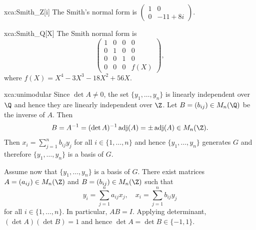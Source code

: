  \begin{sol}{xca:Smith_Z[i]}
 	The Smith's normal form is $\begin{pmatrix}
 		1 & 0\\
 		0 & -11+8i
 	\end{pmatrix}$. 
\end{sol}




\begin{sol}{xca:Smith_Q[X]}
 	The Smith normal form is 
 	\[
 		\begin{pmatrix}
 			1 & 0 & 0 & 0 \\
 			0 & 1 & 0 & 0 \\
 			0 & 0 & 1 & 0 \\
 			0 & 0 & 0 & f(X)
 		\end{pmatrix},
 	\]
 	where $f(X)=X^4 - 3X^3 - 18X^2 + 56X$. 
 \end{sol}

\begin{sol}{xca:unimodular}
    Since $\det A\ne 0$, the set $\{y_1,\dots,y_n\}$ is linearly independent over $\Q$
    and hence they are linearly independent over $\Z$. 
    Let $B=(b_{ij})\in M_n(\Q)$ be the inverse of $A$. Then 
    \[
    B=A^{-1}=(\det A)^{-1}\operatorname{adj}(A)=\pm\operatorname{adj}(A)\in M_n(\Z).
    \]
    Then $x_i=\sum_{j=1}^n b_{ij}y_j$ for all $i\in\{1,\dots,n\}$ 
    and hence $\{y_1,\dots,y_n\}$ generates $G$ and therefore 
    $\{y_1,\dots,y_n\}$ is a basis of $G$. 
    
    Assume now that $\{y_1,\dots,y_n\}$ is a basis of $G$. There exist matrices 
    $A=(a_{ij})\in M_n(\Z)$ and $B=(b_{ij})\in M_n(\Z)$ such that
    \[
    y_i=\sum_{j=1}^{n}a_{ij}x_j,\quad
    x_i=\sum_{j=1}^{n}b_{ij}y_j
    \]
    for all $i\in\{1,\dots,n\}$. In particular, 
    $AB=I$. Applying determinant, $(\det A)(\det B)=1$ and hence $\det A=\det B\in\{-1,1\}$. 
\end{sol}

    
